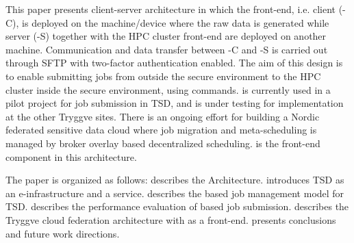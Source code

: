 This paper presents \name client-server architecture in which the \fs front-end, i.e. \name client (\name-C), is deployed on the machine/device where the raw data is generated while \name server (\name-S) together with the HPC cluster front-end are deployed on another machine. Communication and data transfer between \name-C and \name-S is carried out through SFTP with two-factor authentication enabled. The aim of this design is to enable submitting jobs from outside the secure environment to the HPC cluster inside the secure environment, using \fs commands. \name is currently used in a pilot project for job submission in TSD, and is under testing for implementation at the other Tryggve sites. There is an ongoing effort for building a Nordic federated sensitive data cloud where job migration and meta-scheduling is managed by broker overlay based decentralized scheduling. \name is the front-end component in this architecture.

The paper is organized as follows:  describes the \name \fs Architecture.  introduces TSD as an e-infrastructure and a service.  describes the \name based job management model for TSD.  describes the performance evaluation of \name based job submission.  describes the Tryggve cloud federation architecture with \name as a front-end.  presents conclusions and future work directions.  
